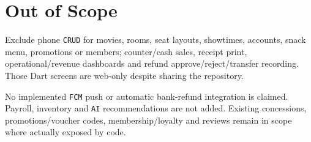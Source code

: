\clearpage
\section{Out of Scope}\label{sec:srs-24}
Exclude phone \texttt{CRUD} for movies, rooms, seat layouts, showtimes, accounts, snack menu, promotions or members; counter/\allowbreak{}cash sales, receipt print, operational/\allowbreak{}revenue dashboards and refund approve/\allowbreak{}reject/\allowbreak{}transfer recording. Those Dart screens are web-only despite sharing the repository.

No implemented \texttt{FCM} push or automatic bank-refund integration is claimed. Payroll, inventory and \texttt{AI} recommendations are not added. Existing concessions, promotions/\allowbreak{}voucher codes, membership/\allowbreak{}loyalty and reviews remain in scope where actually exposed by code.
